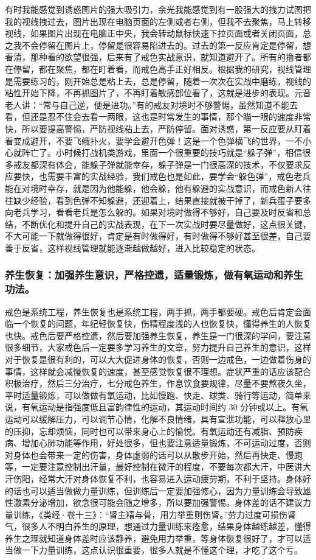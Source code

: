 有时我能感觉到诱惑图片的强大吸引力，余光我能感觉到有一股强大的拽力试图把我的视线拽过去，图片出现在电脑页面的左侧或者右侧，但我不去聚焦，马上转移视线，如果图片出现在电脑正中央，我会转动鼠标快速下拉页面或者关闭页面，总之我不会停留在图片上，停留是很容易陷进去的。过去的第一反应肯定是停留，想看清，那种看的欲望很强，后来有了戒色实战意识，就知道避开了。所有的撸者都在停留，都在聚焦，都在盯着看，而戒色高手正好相反。根据我的研究，视线管理是需要练习的，刚开始总是粘上去，总是停留，随着一次次在实战中磨练，视线的粘性开始下降，不再抓图片了，不再盯着敏感部位看了，这就是进步的表现。元音老人讲：“常与自己逆，便是进功。”有的戒友对境时不够警惕，虽然知道不能去看，但还是忍不住会去看一两眼，这也是时常发生的事情，那个瞄一眼的速度非常快，所以要提高警惕，严防视线粘上去，严防停留。面对诱惑，第一反应要从盯着看变成避开，不要飞蛾扑火，要学会避开色弹！这是一个色弹横飞的世界，一不小心就阵亡了。小时候打战机类游戏，里面一个很重要的技巧就是“躲子弹”，相信很多戒友都深有体会，能躲子弹就能幸存，躲子弹是一门很高深的技术，不仅要求反应要快，也需要丰富的实战经验，我们戒色也是如此，要学会“躲色弹”，戒色老兵能在对境时幸存，就是因为他能躲，他会躲，他有躲避的实战意识，而戒色新人往往缺少经验，看到色弹不知躲避，还迎着上，结果直接就被干掉了，新兵蛋子要多向老兵学习，看看老兵是怎么躲的。如果对境时做得不够好，自己要及时反省和总结，不断优化和提升自己的实战表现，在下一次实战时要尽量做好，这点很关键，不大可能一下就做得很好，肯定是有时做得好，有时做得不够好甚至很差，自己要善于反省，这样视线管理就能逐渐越做越好，进入比较稳定的状态。

\subsubsection{养生恢复：加强养生意识，严格控遗，适量锻炼，做有氧运动和养生功法。}

戒色是系统工程，养生恢复也是系统工程，两手抓，两手都要硬。戒色后肯定会面临一个恢复的问题，年纪轻恢复快，伤精程度浅的人也恢复快，懂得养生的人恢复也快。戒色后要严格控遗，然后要加强养生恢复，养生是一门很深的学问，要注意很多细节，大家戒色后一定要多学习养生的文章，努力提升自己养生的意识，这样对于恢复是很有利的，可以大大促进身体的恢复，否则一边戒色，一边做着伤身的事情，这样就会减慢恢复的速度，甚至感觉恢复很不理想。症状严重的话应该配合积极治疗，然后三分治疗，七分戒色养生，作息饮食要规律，尽量不要熬夜久坐，平时适量锻炼，可以做做有氧运动，比如慢跑、快走、球类、骑行等运动，简单来说，有氧运动是指强度低且富韵律性的运动，其运动时间约 30 分钟或以上。有氧运动可以缓解压力，可以调节心情，化解不良情绪，具有宣泄功能，可以释放心里的压抑，忘却烦恼，同时也可以带来身心上的愉悦。有氧运动还有减脂、预防疾病、增加心肺功能等作用，好处很多，但也要注意适量锻炼，不可运动过度，否则对身体也会带来一定的伤害，身体虚弱的话可以从散步开始，然后再快走、慢跑等，一定要注意控制出汗量，最好控制在微汗的程度，不要每次都大汗，中医讲大汗伤阳，经常大汗对身体恢复不利，也容易进入运动疲劳期，不利于坚持。身体好的话也可以适当做做力量训练，但训练后一定要加强修心，因为力量训练会导致雄性激素分泌增加，欲念很可能会随之增多，所以要加强警惕。身体差的话不建议力量训练，《类经·卷十三》：“肾主精与骨，用力举重则伤肾。”劳力过度可损伤肾气，很多人不明白养生的原理，想通过力量训练来痊愈，结果身体越练越差，懂得养生之理就知道身体差时应该静养，避免用力举重，等身体恢复很好了，才可以适当做一下力量训练，这点认识很重要，很多人就是不懂这个理，才吃了这个亏。

